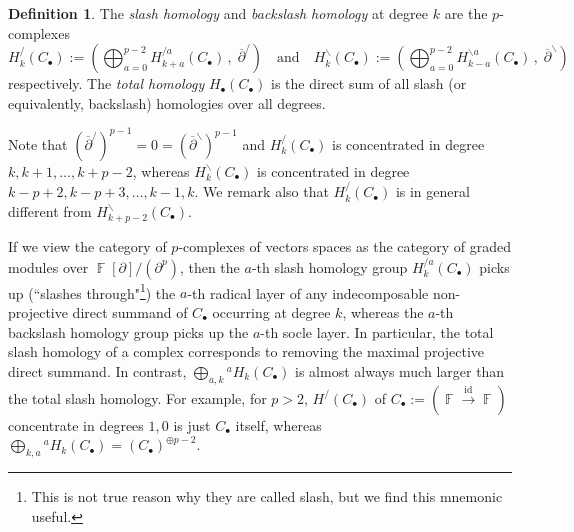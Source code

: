 \documentclass[a4paper]{amsart}
\numberwithin{equation}{subsection}
\theoremstyle{definition}
\newtheorem{definition}[theorem]{Definition}
\DeclareMathOperator{\F}{\mathbb{F}}
\DeclareMathOperator{\Z}{\mathbb{Z}}
\newcommand{\interval}[1]{\llbracket #1 \rrbracket}
\DeclareMathOperator{\Ker}{\mathrm{Ker}}
\DeclareMathOperator{\Image}{\mathrm{Im}}
\numberwithin{equation}{subsection}
\begin{document}

\begin{definition}
The \emph{slash homology} and \emph{backslash homology} at degree $k$ are the $p$-complexes
\[
H_k^{\slash}(C_\bullet):=\left( \bigoplus_{a=0}^{p-2} H_{k+a}^{\slash a}(C_\bullet)\,,\; \overline{\partial}^{\slash}\right) \quad\text{and}\quad H_k^{\backslash}(C_\bullet):=\left( \bigoplus_{a=0}^{p-2} H_{k-a}^{\backslash a}(C_\bullet)\,,\; \overline{\partial}^{\backslash}\right) 
\]
respectively.  The \emph{total homology} $H_\bullet(C_\bullet)$ is the direct sum of all slash (or equivalently, backslash) homologies over all degrees.
\end{definition}
Note that $(\overline{\partial}^{\slash})^{p-1}=0=(\overline{\partial}^{\backslash})^{p-1}$ and $H_k^{\slash}(C_\bullet)$ is concentrated in degree $k, k+1, \ldots, k+p-2$, whereas $H_k^{\backslash}(C_\bullet)$ is concentrated in degree $k-p+2, k-p+3, \ldots, k-1, k$.  We remark also that $H_k^{\slash}(C_\bullet)$ is in general different from $H_{k+p-2}^{\backslash}(C_\bullet)$.

If we view the category of $p$-complexes of vectors spaces as the category of graded modules over $\F[\partial]/(\partial^p)$, then the $a$-th slash homology group $H_k^{/a}(C_\bullet)$ picks up (``slashes through"\footnote{This is not true reason why they are called slash, but we find this mnemonic useful.}) the $a$-th radical layer of any indecomposable non-projective direct summand of $C_\bullet$ occurring at degree $k$, whereas the $a$-th backslash homology group picks up the $a$-th socle layer. 
In particular, the total slash homology of a complex corresponds to removing the maximal projective direct summand.
In contrast, $\bigoplus_{a,k} {}^aH_k(C_\bullet)$ is almost always much larger than the total slash homology.  For example, for $p>2$, $H^{/}(C_\bullet)$ of $C_\bullet:=(\F\xrightarrow{\mathrm{id}}\F)$ concentrate in degrees $1,0$ is just $C_\bullet$ itself, whereas $\bigoplus_{k,a} {}^aH_k(C_\bullet) = (C_\bullet)^{\oplus p-2}$.
\end{document}
